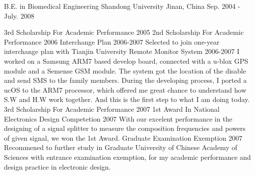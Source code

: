 \begin{cventries}
  \cventry
    {B.E. in Biomedical Engineering} %
    {Shandong University} %
    {Jinan, China} %
    {Sep. 2004 - July. 2008} %
    {
      \begin{cvsubentries} %
        \cvsubentry
          {}
          {3rd Scholarship For Academic Performance}
          {2005}
          {}
        \cvsubentry
          {}
          {2nd Scholarship For Academic Performance}
          {2006}
          {}
        \cvsubentry
          {}
          {Interchange Plan}
          {2006-2007}
          {Selected to join one-year interchange plan with Tianjin University}
        \cvsubentry
          {}
          {Remote Monitor System}
          {2006-2007}
          {I worked on a Samsung ARM7 based develop board, connected with a u-blox GPS module and a Semense GSM module. The system got the location of the disable and send SMS to the family members. During the developing process, I ported a ucOS to the ARM7 processor, which offered me great chance to understand how S.W and H.W work together. And this is the first step to what I am doing today.}
        \cvsubentry
          {}
          {3rd Scholarship For Academic Performance}
          {2007}
          {}
        \cvsubentry
          {}
          {1st Award In National Electronics Design Competetion}
          {2007}
          {With our excelent performance in the designing of a signal splitter to measure the composition frequencies and powers of given signal, we won the 1st Award.}
        \cvsubentry
          {}
          {Graduate Examination Exemption}
          {2007}
          {Recommened to further study in Graduate University of Chinese Academy of Sciences with entrance examination exemption, for my academic performance and design practice in electronic design.}
      \end{cvsubentries}
    }

\end{cventries}
